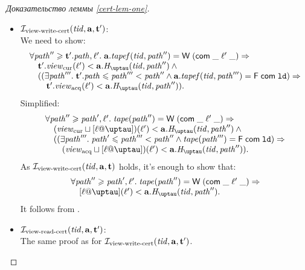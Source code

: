 \begin{proof}[Доказательство леммы \ref{cert-lem-one}]
\begin{itemize}
\begin{itemize}
          \item $\mathcal{I}_{\textup{\rm view-write-cert}}(\mathit{tid}, \mathbf{a}, \mathbf{t}')$: \\
            We need to show:
            \[\begin{array}{l}
      \forall \cpath'' \ge \tT'.\cpath, \loc'. \; \aT.\tapef(\tId, \cpath'') = \tapeWrite{(\tapeWriteCommitted{\_}{\loc'}{\_})} \Rightarrow \\
      \quad \tT'.\Rcur(\loc') < \aT.\tmap(\tId, \cpath'') \land {} \\
      \quad ((\exists \cpath'''. \; \tT'.\cpath \le \cpath''' < \cpath'' \land 
             \aT.\tapef(\tId, \cpath''') = \tapeFence{\Committed}{\LD}) \Rightarrow \\
      \quad \quad \tT'.\Racq(\loc') < \aT.\tmap(\tId, \cpath'')).\\
            \end{array}\]
            Simplified:
            \[\begin{array}{l}
      \forall \cpath'' \ge \cpath', \loc'. \; \tape(\cpath'') = \tapeWrite{(\tapeWriteCommitted{\_}{\loc'}{\_})} \Rightarrow \\
      \quad (\Rcur \sqcup [\loc @ \tau])(\loc') < \aT.\tmap(\tId, \cpath'') \land {} \\
      \quad ((\exists \cpath'''. \; \cpath' \le \cpath''' < \cpath'' \land 
             \tape(\cpath''') = \tapeFence{\Committed}{\LD}) \Rightarrow \\
      \quad \quad (\Racq \sqcup [\loc @ \tau])(\loc') < \aT.\tmap(\tId, \cpath'')).\\
            \end{array}\]
            As $\mathcal{I}_{\textup{\rm view-write-cert}}(\mathit{tid}, \mathbf{a}, \mathbf{t})$ holds, it's enough to show that:
            \[\begin{array}{l}
      \forall \cpath'' \ge \cpath', \loc'. \; \tape(\cpath'') = \tapeWrite{(\tapeWriteCommitted{\_}{\loc'}{\_})} \Rightarrow \\
      \quad [\loc @ \tau](\loc') < \aT.\tmap(\tId, \cpath'').
            \end{array}\]
            It follows from \app{\ref{thm:invAview}}.
          \item $\mathcal{I}_{\textup{\rm view-read-cert}}(\mathit{tid}, \mathbf{a}, \mathbf{t}')$: \\
            The same proof as for $\mathcal{I}_{\textup{\rm view-write-cert}}(\mathit{tid}, \mathbf{a}, \mathbf{t}')$.
      \end{itemize}


\end{itemize}
\end{proof}
